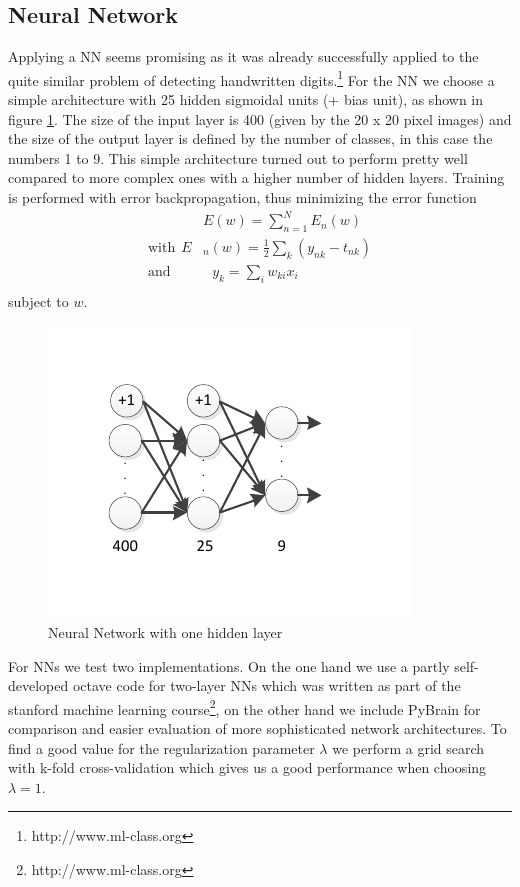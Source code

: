 \documentclass{article}
\begin{document}
\subsection{Neural Network}
Applying a NN seems promising as it was already successfully applied to the quite similar problem of detecting handwritten digits.\footnote{http://www.ml-class.org} For the NN we choose a simple architecture with 25 hidden sigmoidal units (+ bias unit), as shown in figure \ref{fig:nn}. The size of the input layer is 400 (given by the 20 x 20 pixel images) and the size of the output layer is defined by the number of classes, in this case the numbers 1 to 9. This simple architecture turned out to perform pretty well compared to more complex ones with a higher number of hidden layers. Training is performed with error backpropagation, thus minimizing the error function
\begin{align*}
& E(w) = \sum_{n=1}^N E_n(w)\\
\text{with}~~E&_n(w) = \frac{1}{2}\sum_k (y_{nk}-t_{nk})\\
\text{and}~~~~~&~~~y_k = \sum_i w_{ki}x_{i}\\
\end{align*}
subject to $w$.
\begin{figure}[ht]
	\centerline{\includegraphics[width=\columnwidth, trim=0 30 0 30]{../nn}}
	\caption{Neural Network with one hidden layer}
	\label{fig:nn}
\end{figure}
For NNs we test two implementations. On the one hand we use a partly self-developed octave code for two-layer NNs which was written as part of the stanford machine learning course\footnote{http://www.ml-class.org}, on the other hand we include PyBrain \cite{schaul2010pybrain} for comparison and easier evaluation of more sophisticated network architectures. To find a good value for the regularization parameter $\lambda$ we perform a grid search with k-fold cross-validation which gives us a good performance when choosing $\lambda = 1$.
\end{document}

